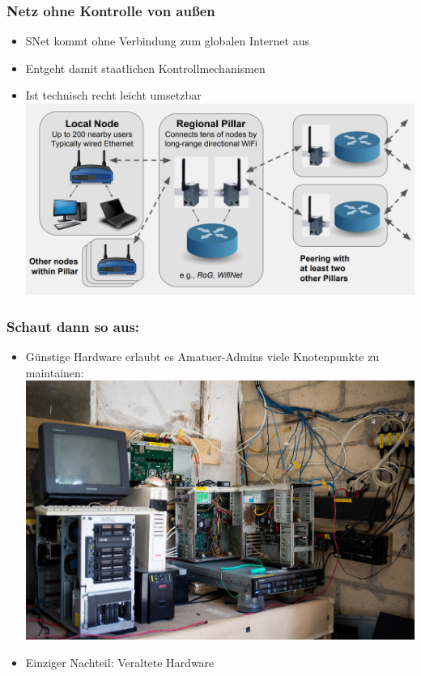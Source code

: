 \begin{frame}
\frametitle{Netz ohne Kontrolle von außen}
	\begin{itemize}
		\item SNet kommt ohne Verbindung zum globalen Internet aus
		\item Entgeht damit staatlichen Kontrollmechanismen
		\item Ist technisch recht leicht umsetzbar
			\includegraphics[width=\textwidth]{images/snet_tech.jpg}
	\end{itemize}
	
\end{frame}
		
\begin{frame}
\frametitle{Schaut dann so aus:}
	\begin{itemize}
		\item Günstige Hardware erlaubt es Amatuer-Admins viele Knotenpunkte zu maintainen:
			\includegraphics[width=\textwidth]{images/snet_pillar.jpg}
		\item Einziger Nachteil: Veraltete Hardware
	\end{itemize}
\end{frame}
